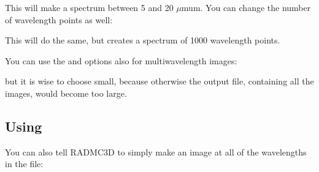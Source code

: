 \documentclass[letterpaper,10pt,english]{sphinxmanual}
\begin{document}
\begin{sphinxVerbatim}[commandchars=\\\{\}]
        
\end{sphinxVerbatim}

This will make a spectrum between 5 and 20 \(\mu\)mu\textasciigrave{}m. You
can change the number of wavelength points as well:

\begin{sphinxVerbatim}[commandchars=\\\{\}]
          
\end{sphinxVerbatim}

This will do the same, but creates a spectrum of 1000 wavelength points.

You can use the  and  options also for multi\sphinxhyphen{}wavelength
images:

\begin{sphinxVerbatim}[commandchars=\\\{\}]
          
\end{sphinxVerbatim}

but it is wise to choose  small, because otherwise the output file,
containing all the images, would become too large.


\subsection{Using }
\label{\detokenize{imagesspectra:using-allwl}}
You can also tell RADMC\sphinxhyphen{}3D to simply make an image at all of the wavelengths in
the  file:

\begin{sphinxVerbatim}[commandchars=\\\{\}]
      
\end{sphinxVerbatim}
\end{document}
